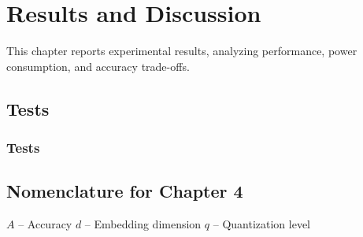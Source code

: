 \chapter{Results and Discussion}

This chapter reports experimental results, analyzing performance, power consumption, and accuracy trade-offs.
\section{Tests}
\subsection{Tests}

\section*{Nomenclature for Chapter 4}
$A$ – Accuracy  
$d$ – Embedding dimension  
$q$ – Quantization level  
